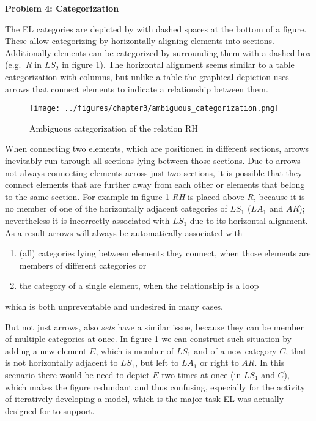 \documentclass[twoside, openright, 12pt]{book}
\begin{document}
\noindent
\textbf{Problem 4: Categorization}
\vspace{1mm}

\noindent
The EL categories are depicted by \cite{Amthor18} with dashed spaces at the bottom of a figure.
These allow categorizing by horizontally aligning elements into sections.
Additionally elements can be categorized by surrounding them with a dashed box (e.g.~\textit{R} in $LS_2$ in figure \ref{fig:ambiguous_categorization}).
The horizontal alignment seems similar to a table categorization with columns, but unlike a table the graphical depiction uses arrows that connect elements to indicate a relationship between them.

\begin{figure}[htb]
	\centering
	\texttt{[image: ../figures/chapter3/ambiguous\_categorization.png]}
	\caption{Ambiguous categorization of the relation RH}
	\label{fig:ambiguous_categorization}
\end{figure}

\noindent
When connecting two elements, which are positioned in different sections, arrows inevitably run through all sections lying between those sections.
Due to arrows not always connecting elements across just two sections, it is possible that they connect elements that are further away from each other or elements that belong to the same section.
For example in figure \ref{fig:ambiguous_categorization} \textit{RH} is placed above $R$, because it is no member of one of the horizontally adjacent categories of $LS_1$ ($LA_1$ and $AR$); nevertheless it is incorrectly associated with $LS_1$ due to its horizontal alignment.
As a result arrows will always be automatically associated with

\begin{enumerate}[label=\alph*)]
\item (all) categories lying between elements they connect, when those elements are members of different categories or 
\item the category of a single element, when the relationship is a loop
\end{enumerate}

\noindent
which is both unpreventable and undesired in many cases.

But not just arrows, also \textit{sets} have a similar issue, because they can be member of multiple categories at once.
In figure \ref{fig:ambiguous_categorization} we can construct such situation by adding a new element $E$, which is member of $LS_1$ and of a new category $C$, that is not horizontally adjacent to $LS_1$, but left to $LA_1$ or right to $AR$.
In this scenario there would be need to depict $E$ two times at once (in $LS_1$ and $C$), which makes the figure redundant and thus confusing, especially for the activity of iteratively developing a model, which is the major task EL was actually designed for to support.\\
\end{document}
